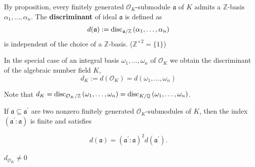 \documentclass[12pt, oneside]{book}
\begin{document}
\begin{definition}
    By proposition, every finitely generated $\mathcal{O}_K$-submodule $\mathfrak{a}$ of $K$ admits a $\mathbb{Z}$-basis $\alpha_1, \ldots, \alpha_n$.
    The \textbf{discriminant} of ideal $\mathfrak{a}$ is defined as
    \begin{equation*}
        d(\mathfrak{a})
        :=
        \operatorname{disc}_{\mathfrak{a}/\mathbb{Z}}\left(\alpha_1, \ldots, \alpha_n\right)
    \end{equation*}
    is independent of the choice of a $\mathbb{Z}$-basis. ($\mathbb{Z}^{\times 2}=\{1\}$)

    In the special case of an integral basis $\omega_1, \ldots, \omega_n$ of $\mathcal{O}_K$ we obtain the discriminant of the algebraic number field $K$,
    \begin{equation*}
        d_K:=d\left(\mathcal{O}_K\right)=d\left(\omega_1, \ldots, \omega_n\right)
    \end{equation*}
    \begin{remark}
        Note that $d_K=\operatorname{disc}_{\mathcal{O}_K/\mathbb{Z}}\left(\omega_1, \ldots, \omega_n\right)=\operatorname{disc}_{K/\mathbb{Q}}\left(\omega_1, \ldots, \omega_n\right)$.
    \end{remark}
\end{definition}

\begin{proposition}
    If $\mathfrak{a} \subseteq \mathfrak{a}^{\prime}$ are two nonzero finitely generated $\mathcal{O}_K$-submodules of $K$, then the index $\left(\mathfrak{a}^{\prime}: \mathfrak{a}\right)$ is finite and satisfies

    \begin{equation*}
        d(\mathfrak{a})=\left(\mathfrak{a}^{\prime}: \mathfrak{a}\right)^2 d\left(\mathfrak{a}^{\prime}\right) .
    \end{equation*}

\end{proposition}






\begin{corollary}
    $d_{\mathcal{O}_K}\neq 0$
\end{corollary}
\end{document}
